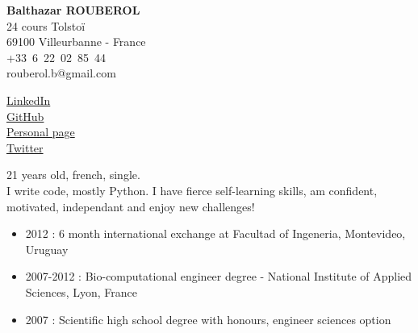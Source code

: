 


\pagestyle{empty}

\begin{minipage}{0.6\textwidth}
\raggedright
{
        \textbf{\huge Balthazar ROUBEROL}\\
        \medskip
        {\scriptsize 24 cours Tolstoï \\
        69100 Villeurbanne - France \\
        +33~6~22~02~85~44 \\
        rouberol.b@gmail.com \\
        }
}
\end{minipage}
\begin{minipage}{0.395\textwidth}
\raggedleft
{	
		{\scriptsize
		\href{http://www.linkedin.com/profile/view?id=148957121\&locale=en\_US\&trk=tab\_pro}{LinkedIn} \\
		\href{https://github.com/BaltoRouberol}{GitHub}\\
		\href{http://page.brouberol.imap.cc}{Personal page}\\
        \href{https://twitter.com/BaltoRouberol}{Twitter}\\
        
        }
}
\end{minipage}

\bigskip


{\scriptsize 21 years old, french, single.\\ I write code, mostly Python. I have fierce self-learning skills, am confident, motivated, independant and enjoy new challenges! }\\

\vspace{-7mm}

\begin{itemize}
\renewcommand{\labelitemi}{$\circ$}
		\item 2012 : 6 month international exchange at Facultad of Ingeneria, Montevideo, Uruguay
        \item 2007-2012 : Bio-computational engineer degree -  National Institute of Applied Sciences, Lyon, France
        \item 2007 : Scientific high school degree with honours, engineer sciences option
\end{itemize}

